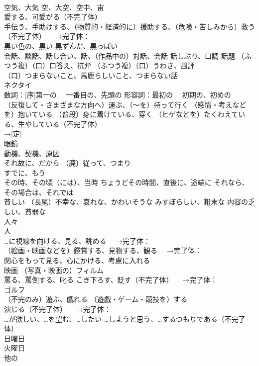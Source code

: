 \documentclass[8pt]{extreport}
\begin{document}
\begin{CJK}{UTF8}{min}
\\	空気、大気 空、大空、空中、宙
\\	愛する、可愛がる（不完了体）
\\	手伝う、手助けする、（物質的・経済的に）援助する、（危険・苦しみから）救う（不完了体） 　→完了体：
\\	黒い色の、黒い 黒ずんだ、黒っぽい
\\	会話、談話、話し合い、話、（作品中の）対話、会話 話しぶり、口調 話題 （ふつう複）（口）口答え、抗弁 （ふつう複）（口）うわさ、風評
\\	（口）つまらないこと、馬鹿らしいこと、つまらない話
\\	ネクタイ
\\	数詞：[序]第一の 　一番目の、先頭の 形容詞：最初の 　初期の、初めの
\\	[不定]（反復して・さまざまな方向へ）運ぶ、（〜を）持って行く （感情・考えなどを）抱いている （普段）身に着けている、穿く （ヒゲなどを）たくわえている、生やしている（不完了体）
\\	→[定]
\\	眼鏡
\\	動機、契機、原因
\\	それ故に、だから （廃）従って、つまり
\\	すでに、もう
\\	その時、その頃（には）、当時 ちょうどその時間、直後に、途端に それなら、その場合は、それでは
\\	貧しい （長尾）不幸な、哀れな、かわいそうな みすぼらしい、粗末な 内容の乏しい、貧弱な
\\	人々
\\	人
\\	…に視線を向ける、見る、眺める 　→完了体：
\\	（絵画・映画などを）鑑賞する、見物する、観る 　→完了体：
\\	関心をもって見る、心にかける、考慮に入れる
\\	映画 （写真・映画の）フィルム
\\	罵る、罵倒する、叱る こき下ろす、貶す（不完了体） 　→完了体：
\\	ゴルフ
\\	（不完のみ）遊ぶ、戯れる （遊戯・ゲーム・競技を）する 
\\	演じる（不完了体） 　→完了体：
\\	…が欲しい、…を望む、…したい …しようと思う、…するつもりである（不完了体） 
\\	日曜日
\\	火曜日
\\	他の

\end{CJK}
\end{document}
